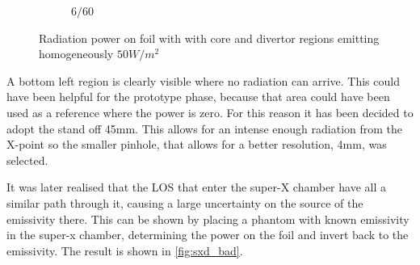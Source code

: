 \begin{figure}
\begin{subfigure}{0.50\textwidth}
         \caption{$6/60$}
         \label{fig:6_60_all}
     \end{subfigure}

    \caption{Radiation power on foil with with core and divertor regions emitting homogeneously $50W/m^2$}
    \label{fig:cherab2}
\end{figure}

A bottom left region is clearly visible where no radiation can arrive. This could have been helpful for the prototype phase, because that area could have been used as a reference where the power is zero.
For this reason it has been decided to adopt the stand off 45mm. This allows for an intense enough radiation from the X-point so the smaller pinhole, that allows for a better resolution, 4mm, was selected.

It was later realised that the LOS that enter the super-X chamber have all a similar path through it, causing a large uncertainty on the source of the emissivity there. This can be shown by placing a phantom with known emissivity in the super-x chamber, determining the power on the foil and invert back to the emissivity. The result is shown in \autoref{fig:sxd_bad}.

